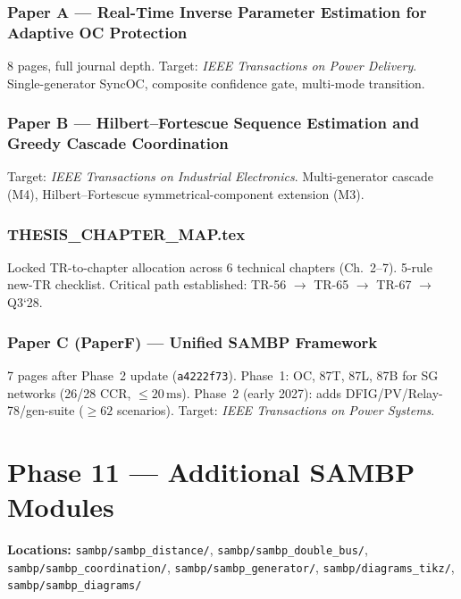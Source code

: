 \documentclass[11pt,a4paper]{article}
\begin{document}
\subsubsection*{Paper A — Real-Time Inverse Parameter Estimation for Adaptive OC Protection}
8 pages, full journal depth. Target: \emph{IEEE Transactions on Power Delivery}.
Single-generator SyncOC, composite confidence gate, multi-mode transition.

\subsubsection*{Paper B — Hilbert--Fortescue Sequence Estimation and Greedy Cascade Coordination}
Target: \emph{IEEE Transactions on Industrial Electronics}.
Multi-generator cascade (M4), Hilbert--Fortescue symmetrical-component extension (M3).

\subsubsection*{THESIS\_CHAPTER\_MAP.tex}
Locked TR-to-chapter allocation across 6 technical chapters (Ch.\ 2--7).
5-rule new-TR checklist. Critical path established:
TR-56 $\to$ TR-65 $\to$ TR-67 $\to$ Q3\textquoteleft28.

\subsubsection*{Paper C (PaperF) — Unified SAMBP Framework}
7 pages after Phase~2 update (\texttt{a4222f73}).
Phase~1: OC, 87T, 87L, 87B for SG networks (26/28 CCR, $\leq 20\,\mathrm{ms}$).
Phase~2 (early 2027): adds DFIG/PV/Relay-78/gen-suite ($\geq 62$ scenarios).
Target: \emph{IEEE Transactions on Power Systems}.

\newpage
\section{Phase 11 — Additional SAMBP Modules}

\begin{phasebox}
\textbf{Locations:} \texttt{sambp/sambp\_distance/},
\texttt{sambp/sambp\_double\_bus/},
\texttt{sambp/sambp\_coordination/},
\texttt{sambp/sambp\_generator/},
\texttt{sambp/diagrams\_tikz/},
\texttt{sambp/sambp\_diagrams/}
\end{phasebox}
\end{document}
